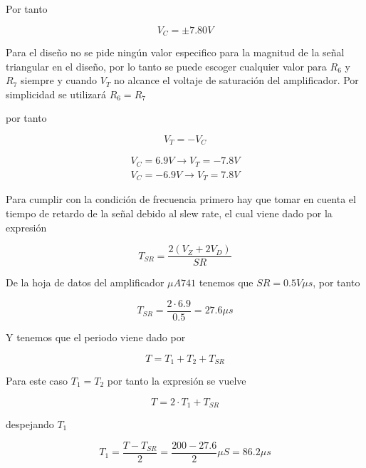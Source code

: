 Por tanto

\begin{equation*}
    V_{C} = \pm 7.80V
\end{equation*}

Para el diseño no se pide ningún valor especifico para la magnitud de la señal triangular en el diseño, por lo tanto se puede escoger cualquier valor para $R_6$ y $R_7$ siempre y cuando $V_T$ no alcance el voltaje de saturación del amplificador. Por simplicidad se utilizará $R_6 = R_7$

por tanto 

\begin{equation*}
    V_T = - V_C
\end{equation*}

\begin{align}
    V_C= 6.9V \rightarrow V_T = -7.8V \\
    V_C = -6.9V \rightarrow V_T = 7.8V
\end{align}

Para cumplir con la condición de frecuencia primero hay que tomar en cuenta el tiempo de retardo de la señal debido al slew rate, el cual viene dado por la expresión

\begin{equation*}
    T_{SR} = \frac{2(V_Z + 2 V_D)}{SR}
\end{equation*}

De la hoja de datos del amplificador $\mu A741$ tenemos que $SR = 0.5 V\mu s$, por tanto

\begin{equation*}
    T_{SR} = \frac{2 \cdot 6.9}{0.5} = 27.6 \mu s
\end{equation*}

Y tenemos que el periodo viene dado por 

\begin{equation*}
    T = T_1 + T_2 + T_{SR}
\end{equation*}

Para este caso $T_1 = T_2$ por tanto la expresión se vuelve

\begin{equation*}
    T = 2 \cdot T_1 + T_{SR}
\end{equation*}

despejando $T_1$

\begin{equation*}
    T_1 = \frac{T - T_{SR}}{2} = \frac{200 - 27.6}{2} \mu S = 86.2 \mu s
\end{equation*}

